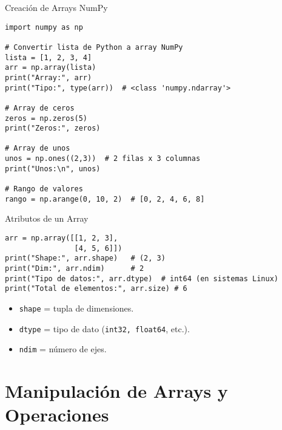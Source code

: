 \documentclass[10pt]{beamer}
\begin{document}
\begin{frame}[fragile]{Creación de Arrays NumPy}
\begin{verbatim}
import numpy as np

# Convertir lista de Python a array NumPy
lista = [1, 2, 3, 4]
arr = np.array(lista)
print("Array:", arr)
print("Tipo:", type(arr))  # <class 'numpy.ndarray'>

# Array de ceros
zeros = np.zeros(5)
print("Zeros:", zeros)

# Array de unos
unos = np.ones((2,3))  # 2 filas x 3 columnas
print("Unos:\n", unos)

# Rango de valores
rango = np.arange(0, 10, 2)  # [0, 2, 4, 6, 8]
\end{verbatim}
\end{frame}

\begin{frame}[fragile]{Atributos de un Array}
\begin{verbatim}
arr = np.array([[1, 2, 3],
                [4, 5, 6]])
print("Shape:", arr.shape)   # (2, 3)
print("Dim:", arr.ndim)      # 2
print("Tipo de datos:", arr.dtype)  # int64 (en sistemas Linux)
print("Total de elementos:", arr.size) # 6
\end{verbatim}
\begin{itemize}
  \item \texttt{shape} = tupla de dimensiones.
  \item \texttt{dtype} = tipo de dato (\texttt{int32, float64}, etc.).
  \item \texttt{ndim} = número de ejes.
\end{itemize}
\end{frame}

\section{Manipulación de Arrays y Operaciones}
\end{document}
